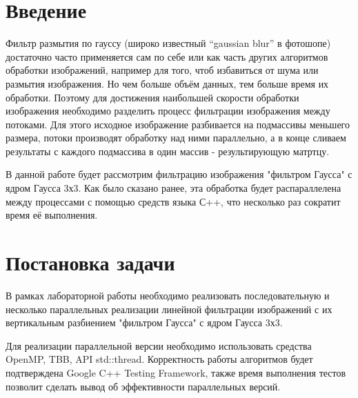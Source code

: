 \documentclass{report}
\begin{document}
\setcounter{page}{2}

\tableofcontents
\newpage

\section*{Введение}
Фильтр размытия по гауссу (широко известный “gaussian blur” в фотошопе) достаточно часто применяется сам по себе или как часть других алгоритмов обработки изображений, например для того, чтоб избавиться от шума или размытия изображения.
Но чем больше объём данных, тем больше время их обработки. Поэтому для достижения наибольшей скорости обработки изображения необходимо разделить процесс фильтрации изображения между потоками. Для этого исходное изображение разбивается на подмассивы меньшего размера, потоки производят обработку над ними параллельно, а в конце сливаем результаты с каждого подмассива в один массив - результирующую матртцу.
\par В данной  работе будет рассмотрим фильтрацию изображения "фильтром Гаусса" с ядром Гаусса 3х3. Как было сказано ранее, эта обработка будет распараллелена между процессами с помощью средств языка С++, что несколько раз сократит время её выполнения.
\newpage

\section*{Постановка задачи}
В рамках лабораторной работы необходимо реализовать последовательную и несколько параллельных реализации линейной фильтрации изображений с их вертикальным разбиением "фильтром Гаусса" с ядром Гаусса 3х3. 
\par Для реализации параллельной версии необходимо использовать средства OpenMP, TBB, API std::thread. Корректность работы алгоритмов будет подтверждена Google C++ Testing Framework, также время выполнения тестов позволит сделать вывод об эффективности параллельных версий.
\newpage

\end{document}
